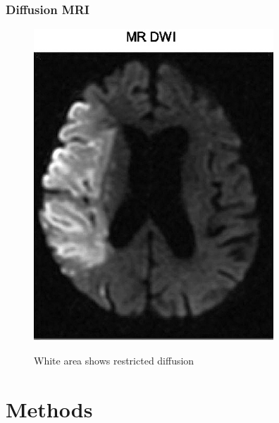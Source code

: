 \documentclass{beamer}
\begin{document}
\begin{frame}
\frametitle{Diffusion MRI}
\begin{figure}[h]
    \centering
    \includegraphics[scale=0.4]{stroke.png}
    \label{fig:mesh1}
    \caption{White area shows restricted diffusion}
\end{figure}
\end{frame}

\section{Methods}
\end{document}
